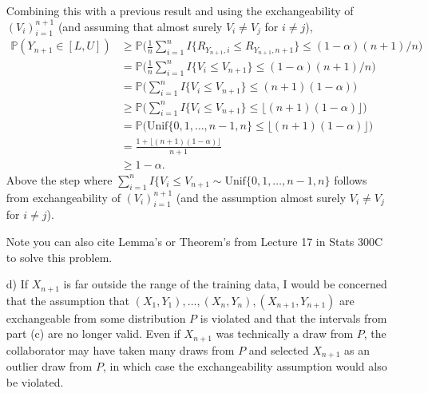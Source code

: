 \begin{enumerate}
Combining this with a previous result and using the exchangeability of $(V_i)_{i=1}^{n+1}$ (and assuming that almost surely $V_i \neq V_j$ for $i \neq j$), 
$$\begin{aligned}
\mathbb{P} (Y_{n+1} \in [L,U] ) & \geq  \mathbb{P} \Big( \frac{1}{n} \sum_{i=1}^n I \{ R_{Y_{n+1}, i} \leq R_{Y_{n+1}, n+1} \} \leq (1- \alpha) (n+1)/n   \Big)
\\ & = \mathbb{P} \Big( \frac{1}{n} \sum_{i=1}^n I \{ V_i \leq  V_{n+1} \} \leq (1- \alpha)(n+1)/n   \Big)
\\ & = \mathbb{P} \Big( \sum_{i=1}^n I \{ V_i \leq  V_{n+1} \} \leq (n+1) (1- \alpha)  \Big)
\\ & \geq \mathbb{P} \Big( \sum_{i=1}^n I \{ V_i \leq  V_{n+1} \} \leq \lfloor (n+1) (1- \alpha) \rfloor  \Big)
\\ & = \mathbb{P} \Big( \text{Unif}\{0,1,\dots,n-1,n \} \leq \lfloor (n+1) (1- \alpha) \rfloor  \Big)
\\ & = \frac{1+\lfloor (n+1) (1- \alpha) \rfloor}{n+1}
\\ & \geq 1-\alpha.
\end{aligned}$$
%
Above the step where $\sum_{i=1}^n I \{ V_i \leq  V_{n+1} \sim  \text{Unif}\{0,1,\dots,n-1,n \} $ follows from exchangeability of $(V_i)_{i=1}^{n+1}$ (and the assumption almost surely $V_i \neq V_j$ for $i \neq j$).

Note you can also cite Lemma's or Theorem's from Lecture 17 in Stats 300C to solve this problem.
\item[d)] If $X_{n+1}$ is far outside the range of the training data, I would be concerned that the assumption that $(X_1,Y_1), \dots,(X_n,Y_n), (X_{n+1},Y_{n+1})$ are exchangeable from some distribution $P$ is violated and that the intervals from part (c) are no longer valid. Even if $X_{n+1}$ was technically a draw from $P$, the collaborator may have taken many draws from $P$ and selected $X_{n+1}$ as an outlier draw from $P$, in which case the exchangeability assumption would also be violated. \newline


\end{enumerate}
